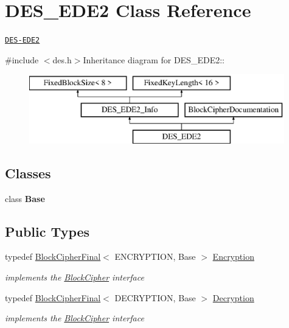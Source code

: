 \hypertarget{class_d_e_s___e_d_e2}{
\section{DES\_\-EDE2 Class Reference}
\label{class_d_e_s___e_d_e2}
}


\href{http://www.weidai.com/scan-mirror/cs.html#DESede}{\tt DES-\/EDE2}  


{\ttfamily \#include $<$des.h$>$}Inheritance diagram for DES\_\-EDE2::\begin{figure}[H]
\begin{center}
\leavevmode
\includegraphics[height=3cm]{class_d_e_s___e_d_e2}
\end{center}
\end{figure}
\subsection*{Classes}
\begin{DoxyCompactItemize}
\item 
class {\bfseries Base}
\end{DoxyCompactItemize}
\subsection*{Public Types}
\begin{DoxyCompactItemize}
\item 
\hypertarget{class_d_e_s___e_d_e2_a922b68789558e6596af345cc975dc152}{
typedef \hyperlink{class_block_cipher_final}{BlockCipherFinal}$<$ ENCRYPTION, Base $>$ \hyperlink{class_d_e_s___e_d_e2_a922b68789558e6596af345cc975dc152}{Encryption}}
\label{class_d_e_s___e_d_e2_a922b68789558e6596af345cc975dc152}

\begin{DoxyCompactList}\small\item\em implements the \hyperlink{class_block_cipher}{BlockCipher} interface \item\end{DoxyCompactList}\item 
\hypertarget{class_d_e_s___e_d_e2_a1f53e6dfa94e7e0f9476e6aba759d53f}{
typedef \hyperlink{class_block_cipher_final}{BlockCipherFinal}$<$ DECRYPTION, Base $>$ \hyperlink{class_d_e_s___e_d_e2_a1f53e6dfa94e7e0f9476e6aba759d53f}{Decryption}}
\label{class_d_e_s___e_d_e2_a1f53e6dfa94e7e0f9476e6aba759d53f}

\begin{DoxyCompactList}\small\item\em implements the \hyperlink{class_block_cipher}{BlockCipher} interface \item\end{DoxyCompactList}\end{DoxyCompactItemize}


